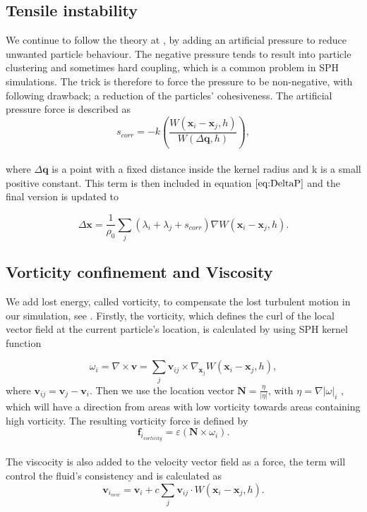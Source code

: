 \subsection{Tensile instability}
We continue to follow the theory at \cite{macklin2013position}, by adding an artificial pressure to reduce unwanted particle behaviour. The negative pressure tends to result into particle clustering and sometimes hard coupling, which is a common problem in SPH simulations. The trick is therefore to force the pressure to be non-negative, with following drawback; a reduction of the particles' cohesiveness. The artificial pressure force is described as
\\
\begin{equation}
\label{eq:Scorr}
s_{corr} = -k \left( \frac{W(\mathbf{x}_i - \mathbf{x}_j, h)}{W(\Delta \mathbf{q}, h)} \right),
\end{equation}
\\
where $\Delta \mathbf{q}$ is a point with a fixed distance inside the kernel radius and k is a small positive constant. This term is then included in equation $\ref{eq:DeltaP}$ and the final version is updated to 

\begin{equation}
\label{eq:DeltaPscorr}
\Delta \mathbf{x} = \frac{1}{\rho_0} \sum\limits_{j} (\lambda_i + \lambda_j + s_{corr}) \nabla W(\mathbf{x}_i - \mathbf{x}_j, h).
\end{equation}

\subsection{Vorticity confinement and Viscosity}
We add lost energy, called vorticity, to compensate the lost turbulent motion in our simulation, see \cite{macklin2013position}. 
Firstly, the vorticity, which defines the curl of the local vector field at the current particle's location, is calculated by using SPH kernel function

\begin{equation}
\label{eq:Omega}
\omega_{i} = \nabla \times \mathbf{v} =  \sum\limits_{j} \mathbf{v}_{ij} \times \nabla_{\mathbf{x}_{j}} W(\mathbf{x}_{i} - \mathbf{x}_{j}, h),
\end{equation}
where $\mathbf{v}_{ij} = \mathbf{v}_{j} - \mathbf{v}_{i}$. Then we use the location vector $\mathbf{N} = \frac{\eta}{|\eta|}$, with $\eta = \nabla|\omega|_{i}$
, which will have a direction from areas with low vorticity towards areas containing high vorticity. The resulting vorticity force is defined by
\\
\begin{equation}
\label{eq:Vorticity}
\mathbf{f}_{i_{vorticity}} = \varepsilon \left(\mathbf{N} \times \omega_{i} \right).
\end{equation}
\\
The viscocity is also added to the velocity vector field as a force, the term will control the fluid's consistency and is calculated as 
\begin{equation}
\label{eq:Viscosity}
\mathbf{v}_{i_{new}} = \mathbf{v}_{i} + c \sum\limits_{j} \mathbf{v}_{ij} \cdot W(\mathbf{x}_i - \mathbf{x}_j, h).
\end{equation}

